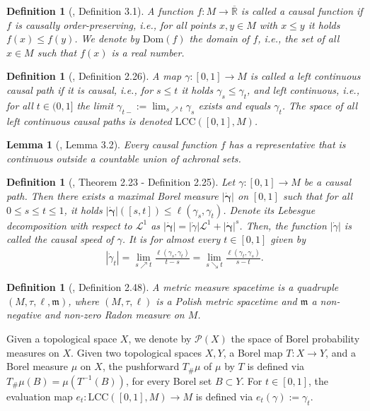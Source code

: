 \documentclass[a4paper,10pt]{article}
\newtheorem{definition}[theorem]{Definition}
\newtheorem{lemma}[theorem]{Lemma}
\numberwithin{equation}{section}
\newcommand{\R}{\mathbb{R}}
\begin{document}
\begin{definition}[\cite{beran2024nonlinear}, Definition 3.1]
    A function $f\colon M \to \overline{\R}$ is called a \emph{causal function} if $f$ is causally order-preserving, i.e., for all points $x, y \in M$ with $x \leq y$ it holds $f(x) \leq f(y)$. We denote by $\mathrm{Dom}(f)$ the domain of $f$, i.e., the set of all $x \in M$ such that $f(x)$ is a real number.
\end{definition}
\smallskip

\begin{definition}[\cite{beran2024nonlinear}, Definition 2.26]
    A map $\gamma\colon [0,1] \to M$ is called a \emph{left continuous causal path} if it is causal, i.e., for $s \leq t$ it holds $\gamma_s \leq \gamma_t$, and left continuous, i.e., for all $t \in (0,1]$ the limit $\gamma_{t-} := \lim_{s \nearrow t}\gamma_s$ exists and equals $\gamma_t$. The space of all left continuous causal paths is denoted $\mathrm{LCC}([0,1], M)$.
\end{definition}

\smallskip
\begin{lemma}[\cite{beran2024nonlinear}, Lemma 3.2]\label{cts_outside_achronal}
    Every causal function $f$ has a representative that is continuous outside a countable union of achronal sets. 
\end{lemma}

\smallskip
\begin{definition}[\cite{beran2024nonlinear}, Theorem 2.23 - Definition 2.25]\label{def_causal_speed}
    Let $\gamma\colon  [0,1] \to M$ be a causal path. Then there exists a maximal Borel measure $|\dot{\boldsymbol{\gamma}}|$ on $[0,1]$ such that for all $0 \leq s \leq t \leq 1$, it holds $|\dot{\boldsymbol{\gamma}}|([s,t]) \leq \ell(\gamma_s, \gamma_t)$. Denote its Lebesgue decomposition with respect to $\mathcal{L}^1$ as $|\dot{\boldsymbol{\gamma}}| = |\dot{\gamma}|\mathcal{L}^1 + |\dot{\boldsymbol{\gamma}}|^s$. 
    Then, the function $|\dot{\gamma}|$ is called the \emph{causal speed} of $\gamma$. It is for almost every $t \in [0,1]$ given by 
    \begin{align}
        |\dot{\gamma}_t| = \lim_{s \nearrow t} \frac{\ell(\gamma_s, \gamma_t)}{t-s} = \lim_{s \searrow t} \frac{\ell(\gamma_t, \gamma_s)}{s-t}.
    \end{align}
\end{definition}
\smallskip

\begin{definition}[\cite{beran2024nonlinear}, Definition 2.48]
   A \emph{metric measure spacetime} is a quadruple $(M, \tau, \ell, \mathfrak{m})$, where $(M, \tau, \ell)$ is a Polish metric spacetime and $\mathfrak{m}$ a non-negative and non-zero Radon measure on $M$.
\end{definition}
Given a topological space $X$, we denote by $\mathcal{P}(X)$ the space of Borel probability measures on $X$. Given two topological spaces $X, Y$, a Borel map $T: X \to Y$, and a Borel measure $\mu$ on $X$, the pushforward $T_{\#}\mu$ of $\mu$ by $T$ is defined via $T_{\#}\mu(B) = \mu (T^{-1}(B))$, for every Borel set $B \subset Y$.
For $t \in [0,1]$, the evaluation map $e_t\colon \mathrm{LCC}([0,1], M) \to M$ is defined via $e_t(\gamma) := \gamma_t$.
\smallskip
\end{document}
